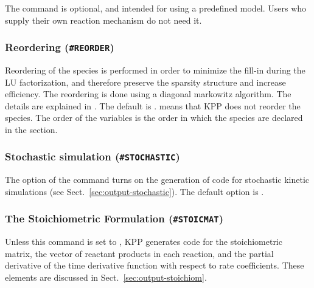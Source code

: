 \documentclass[twoside]{article}
\begin{document}
The  command is optional, and intended for using a
predefined model. Users who supply their own reaction mechanism do not
need it.

\subsubsection{Reordering ({\tt\#REORDER})}
\label{sec:command-reorder}

Reordering of the species is performed in order to minimize the fill-in
during the LU factorization, and therefore preserve the sparsity
structure and increase efficiency.  The reordering is done using a
diagonal markowitz algorithm. The details are explained in
\citet{IMPLEMENTATION}. The default is .  means that
KPP does not reorder the species. The order of the variables is the
order in which the species are declared in the  section.

\subsubsection{Stochastic simulation ({\tt\#STOCHASTIC})}
\label{sec:command-stochastic}

The option  of the  command turns on the
generation of code for stochastic kinetic simulations (see
Sect.~\ref{sec:output-stochastic}).  The default option is .

\subsubsection{The Stoichiometric Formulation ({\tt\#STOICMAT})}
\label{sec:command-stoicmat}

Unless this command is set to , KPP generates code for the
stoichiometric matrix, the vector of reactant products in each reaction,
and the partial derivative of the time derivative function with respect
to rate coefficients. These elements are discussed in
Sect.~\ref{sec:output-stoichiom}.
\end{document}
